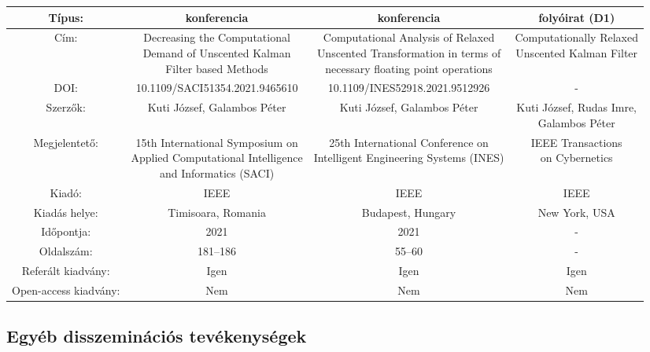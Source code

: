 \documentclass[graybox,envcountchap,sectrefs]{svmono}
\begin{document}
\hspace{2cm}
\begin{turn}{90}
	{\small
		\begin{tabular}{|c|c|c|c|}
			\hline
			Típus: & konferencia & konferencia & folyóirat (D1) \\
			\hline
			Cím: & \makecell{Decreasing the {Computational} \\ {Demand} of {Unscented} {Kalman} \\ {Filter} based {Methods}} & 
			\makecell{Computational {Analysis} of {Relaxed} \\  {Unscented} {Transformation} in  terms of \\ necessary floating point operations} &  
			\makecell{Computationally Relaxed \\ Unscented Kalman Filter} \\
			\hline
			DOI: & 10.1109/SACI51354.2021.9465610 & 10.1109/INES52918.2021.9512926 & - \\
			\hline
			Szerzők: & Kuti J{\'o}zsef, Galambos P{\'e}ter &  Kuti J{\'o}zsef, Galambos P{\'e}ter & \makecell{Kuti József, Rudas Imre,\\ Galambos Péter}  \\
			\hline
			Megjelentető: & \makecell{15th {International} {Symposium} on \\  {Applied} {Computational} {Intelligence} \\ and {Informatics} ({SACI})} & 
			\makecell{25th {International} {Conference}  on\\  {Intelligent} Engineering Systems ({INES})} &
			\makecell{IEEE Transactions \\ on Cybernetics}  \\
			\hline
			Kiadó: & IEEE & IEEE  & IEEE \\
			\hline
			Kiadás helye: & Timisoara, Romania & Budapest, Hungary & New York, USA \\
			\hline
			Időpontja: & 2021 & 2021 &  - \\
			\hline
			Oldalszám: & 181--186  & 55--60 & - \\
			\hline
			Referált kiadvány: & Igen & Igen & Igen \\
			\hline
			Open-access kiadvány: & Nem  & Nem & Nem \\
			\hline
		\end{tabular}
	}
\end{turn}

\subsection{Egyéb disszeminációs tevékenységek}
\end{document}
